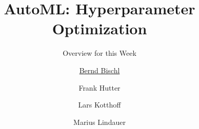 


\newcommand{\inducer}{\mathcal{I}}
\newcommand{\R}{\mathds{R}}

\newenvironment{blocki}[1] %
{
 \begin{block}{#1}\begin{itemize}
}
{
\end{itemize}\end{block}
}

\title[AutoML: Hyperparameter Optimization]{AutoML: Hyperparameter Optimization}
\subtitle{Overview for this Week}
\author[Bernd Bischl]{\underline{Bernd Bischl} \and Frank Hutter \and Lars Kotthoff \and Marius Lindauer}
\institute{}
\date{}






\maketitle




